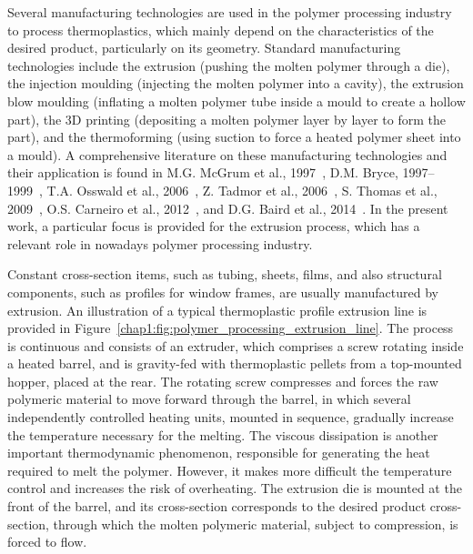Several manufacturing technologies are used in the polymer processing industry to process thermoplastics, which mainly depend on the characteristics of the desired product, particularly on its geometry.
Standard manufacturing technologies include the extrusion (pushing the molten polymer through a die), the injection moulding (injecting the molten polymer into a cavity), the extrusion blow moulding (inflating a molten polymer tube inside a mould to create a hollow part), the 3D printing (depositing a molten polymer layer by layer to form the part), and the thermoforming (using suction to force a heated polymer sheet into a mould).
A comprehensive literature on these manufacturing technologies and their application is found in M.G. McGrum et al., 1997~\cite{chap1:1997mccrum}, D.M. Bryce, 1997--1999~\cite{chap1:1996abryce,chap1:1997bryce,chap1:1998bryce,chap1:1999bryce}, T.A. Osswald et al., 2006~\cite{chap1:2006osswald}, Z. Tadmor et al., 2006~\cite{chap1:2006tadmor}, S. Thomas et al., 2009~\cite{chap1:2009thomas}, O.S. Carneiro et al., 2012~\cite{chap1:2012carneiro}, and D.G. Baird et al., 2014~\cite{chap1:2014baird}.
In the present work, a particular focus is provided for the extrusion process, which has a relevant role in nowadays polymer processing industry.

Constant cross-section items, such as tubing, sheets, films, and also structural components, such as profiles for window frames, are usually manufactured by extrusion.
An illustration of a typical thermoplastic profile extrusion line is provided in Figure~\ref{chap1:fig:polymer_processing_extrusion_line}.
The process is continuous and consists of an extruder, which comprises a screw rotating inside a heated barrel, and is gravity-fed with thermoplastic pellets from a top-mounted hopper, placed at the rear.
The rotating screw compresses and forces the raw polymeric material to move forward through the barrel, in which several independently controlled heating units, mounted in sequence, gradually increase the temperature necessary for the melting.
The viscous dissipation is another important thermodynamic phenomenon, responsible for generating the heat required to melt the polymer.
However, it makes more difficult the temperature control and increases the risk of overheating.
The extrusion die is mounted at the front of the barrel, and its cross-section corresponds to the desired product cross-section, through which the molten polymeric material, subject to compression, is forced to flow.

